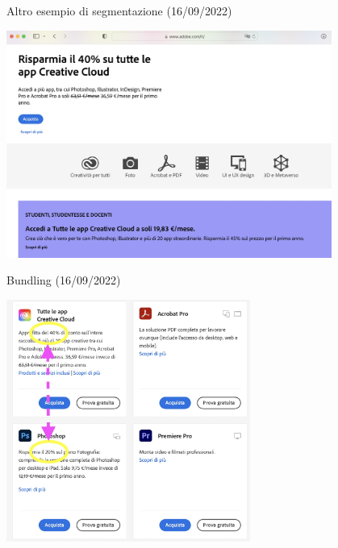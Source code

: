 \documentclass{beamer}
\begin{document}
\begin{frame}
{\centerline{Altro esempio di segmentazione (16/09/2022)}}
\begin{center}
    \includegraphics[width=0.8\textwidth]{A2022.IDSEPC.ConcettoDiSoftware/SegmentationBundlingAdobe.jpg}
\end{center}

\end{frame}

\begin{frame}
{\centerline{Bundling (16/09/2022)}}
\begin{center}
    \includegraphics[width=0.6\textwidth]{A2022.IDSEPC.ConcettoDiSoftware/BundlingAdobe.jpg}
\end{center}

\end{frame}
\end{document}

